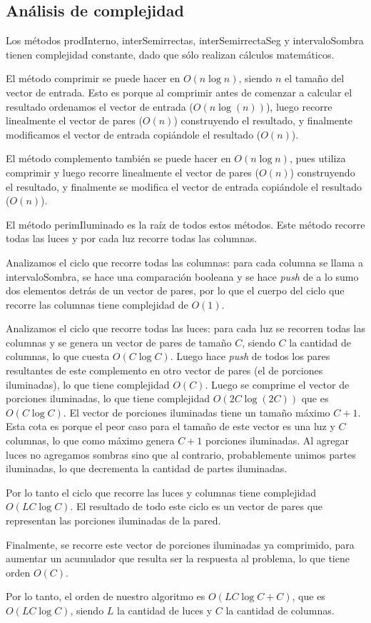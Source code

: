\subsection*{Análisis de complejidad}

Los métodos prodInterno, interSemirrectas, interSemirrectaSeg y intervaloSombra
tienen complejidad constante, dado que sólo realizan cálculos matemáticos.

El método comprimir se puede hacer en $O(n\log n)$, siendo $n$ el tamaño
del vector de entrada. Esto es porque al comprimir antes de comenzar a
calcular el resultado ordenamos el vector de entrada ($O(n\log(n))$), luego
recorre linealmente el vector de pares ($O(n)$) construyendo el resultado, y
finalmente modificamos el vector de entrada copiándole el resultado ($O(n)$).

El método complemento también se puede hacer en $O(n\log n)$, pues
utiliza comprimir y luego recorre linealmente el vector de pares ($O(n)$)
construyendo el resultado, y finalmente se modifica el vector de entrada
copiándole el resultado ($O(n)$).

El método perimIluminado es la raíz de todos estos métodos. Este método
recorre todas las luces y por cada luz recorre todas las columnas.

Analizamos el ciclo que recorre todas las columnas: para cada columna
se llama a intervaloSombra, se hace una comparación booleana y se hace {\sl push}
de a lo sumo dos elementos detrás de un vector de pares, por lo que el cuerpo
del ciclo que recorre las columnas tiene complejidad de $O(1)$.

Analizamos el ciclo que recorre todas las luces: para cada luz se recorren
todas las columnas y se genera un vector de pares de tamaño $C$, siendo $C$
la cantidad de columnas, lo que cuesta $O(C\log C)$. Luego hace
{\sl push} de todos los pares resultantes de este complemento en otro vector de
pares (el de porciones iluminadas), lo que tiene complejidad
$O(C)$. Luego se comprime el vector de porciones iluminadas, lo que tiene
complejidad $O(2C\log(2C))$ que es $O(C\log C)$. El vector de porciones
iluminadas tiene un tamaño máximo $C+1$. Esta cota es porque el peor caso
para el tamaño de este vector es una luz y $C$ columnas, lo que como máximo
genera $C+1$ porciones iluminadas. Al agregar luces no agregamos sombras sino
que al contrario, probablemente unimos partes iluminadas, lo que decrementa
la cantidad de partes iluminadas.

Por lo tanto el ciclo que recorre las luces y columnas tiene complejidad
$O(LC\log C)$. El resultado de todo este ciclo es un vector de pares que
representan las porciones iluminadas de la pared.

Finalmente, se recorre este vector de porciones iluminadas ya comprimido, para
aumentar un acumulador que resulta ser la respuesta al problema, lo que tiene
orden $O(C)$.

Por lo tanto, el orden de nuestro algoritmo es $O(LC\log C+C)$, que es $O(LC\log C)$,
siendo $L$ la cantidad de luces y $C$ la cantidad de columnas.
